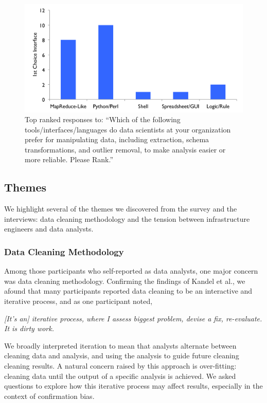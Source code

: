 \begin{figure}[t]
\centering
 \includegraphics[width=\columnwidth]{datafigs/hilda-interface.png}
 \caption{Top ranked responses to: ``Which of the following tools/interfaces/languages do data scientists at your organization prefer for manipulating data, including extraction, schema transformations, and outlier removal, to make analysis easier or more reliable. Please Rank.''\label{fig:interfaces}}
\end{figure}


\subsection{Themes}\label{sec:themes}
We highlight several of the themes we discovered from the survey and the interviews: data cleaning methodology and the tension between infrastructure engineers and data analysts.

\subsubsection{Data Cleaning Methodology}
Among those participants who self-reported as data analysts, one major concern was data cleaning methodology.
Confirming the findings of Kandel et al., we afound that many participants reported data cleaning to be an interactive and iterative process, and as one participant noted,

\vspace{0.7em}
\emph{[It's an] iterative process, where I assess biggest problem, devise a fix, re-evaluate. It is dirty work.}

\vspace{0.5em}

We broadly interpreted iteration to mean that analysts alternate between cleaning data and analysis, and using the analysis to guide future cleaning cleaning results.
A natural concern raised by this approach is over-fitting: cleaning data until the output of a specific analysis is achieved.
We asked questions to explore how this iterative process may affect results, especially in the context of confirmation bias.

